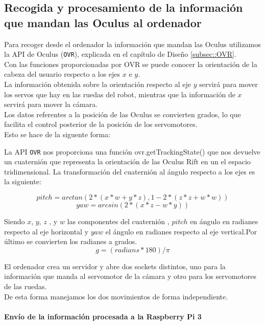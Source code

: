 \documentclass[twoside, 11pt]{epstfg}
\begin{document}
\subsection{Recogida y procesamiento de la información que mandan las Oculus al ordenador}

Para recoger desde el ordenador la información que mandan las Oculus utilizamos la API de Oculus (\texttt{OVR}), explicada en el capítulo de Diseño \ref{subsec::OVR}.\\
Con las funciones proporcionadas por OVR se puede conocer la orientación de la cabeza del usuario respecto a los ejes $x$ e $y$.\\
La información obtenida sobre la orientación respecto al eje $y$ servirá para mover los servos que hay en las ruedas del robot, mientras que la información de $x$ servirá para mover la cámara.\\
Los datos referentes a la posición de las Oculus se convierten grados, lo que facilita el control posterior de la posición de los servomotores.\\ Esto se hace de la siguente forma:

La API \texttt{OVR} nos proporciona una función  ovr.getTrackingState() que nos devuelve un cuaternión que representa la orientación de las Oculus Rift en un el espacio tridimensional. La transformación del cuaternión al ángulo respecto a los ejes es la siguiente:


$$  pitch = arctan(2 * (x*w + y*z), 1 - 2 * (z*z + w*w))$$
$$  yaw = arcsin(2 * (x*z - w*y))$$

Siendo $x$, $y$, $z$ , y $w$ las componentes del cuaternión , $pitch$ en ángulo en radianes respecto al eje horizontal y $yaw$ el ángulo en radianes respecto al eje vertical.Por último se convierten los radianes a grados.
$$g = (radians*180) / \pi$$



El ordenador crea un servidor y abre dos sockets distintos, uno para la información que manda al servomotor de la cámara y otro para los servomotores de las ruedas.\\
De esta forma manejamos los dos movimientos de forma independiente.



\paragraph{Envío de la información procesada a la Raspberry Pi 3}
\end{document}
